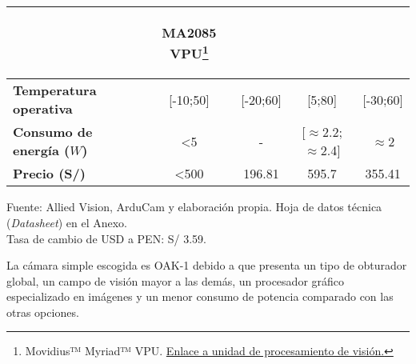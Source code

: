 \begin{itemize}
\begin{savenotes}
\begin{mytable}[H]
\begin{tabular}{l|c|c|c|c|}
\begin{minipage}{\mythirdmaxsizeofcontenttable}
\begin{myflushcenterinsidetable}
				\end{myflushcenterinsidetable}\end{minipage}&
				\begin{minipage}{\mythirdmaxsizeofcontenttable}\begin{myflushcenterinsidetable}
					MA2085 VPU\footnote{Movidius™ Myriad™ VPU. \href{https://www.intel.com/content/www/us/en/products/processors/movidius-vpu/movidius-myriad-x.html}{Enlace a unidad de procesamiento de visión.}}
				\end{myflushcenterinsidetable}\end{minipage}  \\ \hline 
				\multicolumn{1}{|l|}{
				\begin{minipage}{\myforthmaxsizeofcontenttable}	
					\textbf{Temperatura operativa}
				\end{minipage}
				} & [-10;50] & [-20;60] & [5;80] & 
	            [-30;60]
	            \\ \hline
				\multicolumn{1}{|l|}{
				\begin{minipage}{\myforthmaxsizeofcontenttable}	
					\textbf{Consumo de energía ($W$)}
				\end{minipage}
				} & <5 & - & [$\approx$2.2;$\approx$2.4] & 
				$\approx$2
				\\ \hline
				\multicolumn{1}{|l|}{
				\begin{minipage}{\myforthmaxsizeofcontenttable}	
					\textbf{Precio (S/)}
				\end{minipage}
				} & <500 & 196.81 & 595.7 & %
				355.41
				\\ \hline
				\end{tabular}
			\begin{myflushcenteraftertable}	
				Fuente: Allied Vision, ArduCam y elaboración propia. Hoja de datos técnica (\textit{Datasheet}) en el Anexo.\\
				Tasa de cambio de USD a PEN: S/ 3.59.
			\end{myflushcenteraftertable}
		\end{mytable}
	\end{savenotes}
	
	La cámara simple escogida es OAK-1 debido a que presenta un tipo de obturador global, un campo de visión mayor a las demás, un procesador gráfico especializado en imágenes y un menor consumo de potencia comparado con las otras opciones.
	
\end{itemize}

